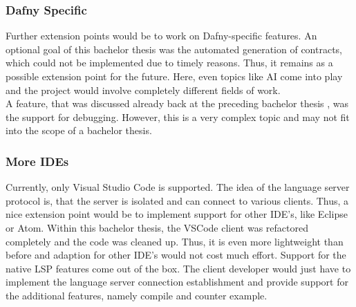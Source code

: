 \subsubsection{Dafny Specific}
Further extension points would be to work on Dafny-specific features.
An optional goal of this bachelor thesis was the automated generation of contracts, which could not be implemented due to timely reasons.
Thus, it remains as a possible extension point for the future.
Here, even topics like AI come into play and the project would involve completely different fields of work.\\

A feature, that was discussed already back at the preceding bachelor thesis \cite{ba}, was the support for debugging.
However, this is a very complex topic and may not fit into the scope of a bachelor thesis.\\


\subsubsection{More IDEs}
Currently, only Visual Studio Code is supported.
The idea of the language server protocol is, that the server is isolated and can connect to various clients.
Thus, a nice extension point would be to implement support for other IDE's, like Eclipse or Atom.
Within this bachelor thesis, the VSCode client was refactored completely and the code was cleaned up.
Thus, it is even more lightweight than before and adaption for other IDE's would not cost much effort.
Support for the native LSP features come out of the box.
The client developer would just have to implement the language server connection establishment and provide support for the additional features, namely compile and counter example.


